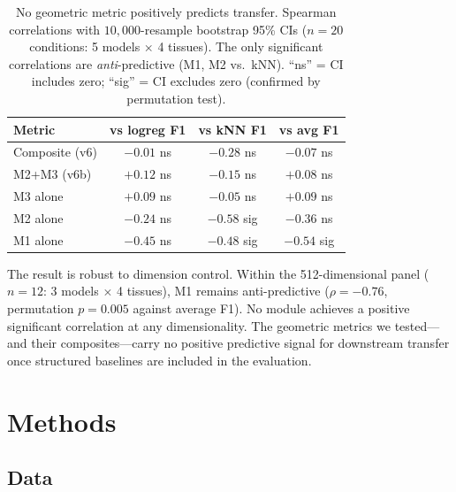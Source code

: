 \documentclass[9pt,lineno]{elife}
\begin{document}
\begin{table}[t]
\centering
\caption{No geometric metric positively predicts transfer. Spearman correlations with $10{,}000$-resample bootstrap 95\% CIs ($n = 20$ conditions: 5 models $\times$ 4 tissues). The only significant correlations are \emph{anti}-predictive (M1, M2 vs.\ kNN). ``ns'' = CI includes zero; ``sig'' = CI excludes zero (confirmed by permutation test).}
\label{tab:probes}
\small
\begin{tabular}{@{}lccc@{}}
\toprule
Metric & vs logreg F1 & vs kNN F1 & vs avg F1 \\
\midrule
Composite (v6) & $-0.01$ ns & $-0.28$ ns & $-0.07$ ns \\
M2+M3 (v6b) & $+0.12$ ns & $-0.15$ ns & $+0.08$ ns \\
M3 alone & $+0.09$ ns & $-0.05$ ns & $+0.09$ ns \\
M2 alone & $-0.24$ ns & $\mathbf{-0.58}$ sig & $-0.36$ ns \\
M1 alone & $-0.45$ ns & $\mathbf{-0.48}$ sig & $\mathbf{-0.54}$ sig \\
\bottomrule
\end{tabular}
\end{table}

The result is robust to dimension control. Within the 512-dimensional panel ($n = 12$: 3 models $\times$ 4 tissues), M1 remains anti-predictive ($\rho = -0.76$, permutation $p = 0.005$ against average F1). No module achieves a positive significant correlation at any dimensionality. The geometric metrics we tested---and their composites---carry no positive predictive signal for downstream transfer once structured baselines are included in the evaluation.


\section{Methods}

\subsection{Data}
\end{document}
